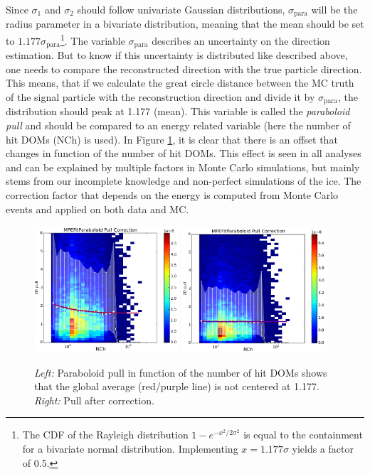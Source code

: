 \noindent Since $\sigma_1$ and $\sigma_2$ should follow univariate Gaussian distributions, $\sigma_\textrm{para}$ will be the radius parameter in a bivariate distribution, meaning that the mean should be set to $1.177\sigma_\textrm{para}$\footnote{The CDF of the Rayleigh distribution $1-e^{-x^2/2\sigma^2}$ is equal to the containment for a bivariate normal distribution. Implementing $x=1.177\sigma$ yields a factor of 0.5.}. The variable $\sigma_\textrm{para}$ describes an uncertainty on the direction estimation. But to know if this uncertainty is distributed like described above, one needs to compare the reconstructed direction with the true particle direction. This means, that if we calculate the great circle distance between the MC truth of the signal particle with the reconstruction direction and divide it by $\sigma_\textrm{para}$, the distribution should peak at 1.177 (mean). This variable is called the \textit{paraboloid pull} and should be compared to an energy related variable (here the number of hit DOMs (NCh) is used). In Figure \ref{fig:paraboloidpull}, it is clear that there is an offset that changes in function of the number of hit DOMs. This effect is seen in all analyses and can be explained by multiple factors in Monte Carlo simulations, but mainly stems from our incomplete knowledge and non-perfect simulations of the ice. The correction factor that depends on the energy is computed from Monte Carlo events and applied on both data and MC.

\begin{figure}[t]
\centering
\includegraphics[width=0.48\textwidth]{chapter7/img/pullbeforecorrection.png}
\includegraphics[width=0.48\textwidth]{chapter7/img/pullaftercorrection.png}
\caption{\textit{Left: }Paraboloid pull in function of the number of hit DOMs shows that the global average (red/purple line) is not centered at 1.177. \textit{Right: }Pull after correction.}
\label{fig:paraboloidpull}
\end{figure}

